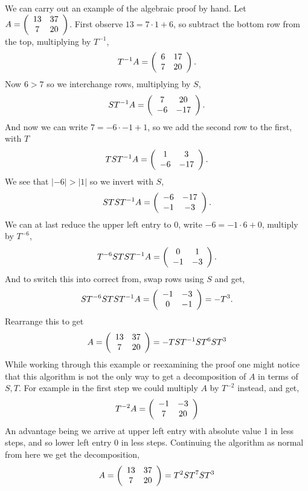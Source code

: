 \begin{example}
We can carry out an example of the algebraic proof by hand. Let $A = \left(\begin{array}{ c c } 13 & 37 \\ 7 & 20 \end{array} \right)$. First observe $13 = 7\cdot 1 + 6$, so subtract the bottom row from the top, multiplying by $T^{-1}$,
$$T^{-1}A = \left(\begin{array}{ c c } 6 & 17 \\ 7 & 20 \end{array} \right).$$
Now $6>7$ so we interchange rows, multiplying by $S$, 
$$ST^{-1}A = \left(\begin{array}{ c c } 7 & 20 \\ -6 & -17  \end{array} \right).$$
And now we can write $7 = -6\cdot -1 +1$, so we add the second row to the first, with $T$
$$TST^{-1}A = \left(\begin{array}{ c c } 1 & 3 \\ -6 & -17  \end{array} \right).$$
We see that $|-6| > |1|$ so we invert with $S$,
$$STST^{-1}A = \left(\begin{array}{ c c } -6 & -17 \\ -1 & -3  \end{array} \right).$$
We can at last reduce the upper left entry to $0$, write $-6 = -1\cdot 6 + 0$, multiply by $T^{-6}$,
$$T^{-6}STST^{-1}A = \left(\begin{array}{ c c } 0 & 1 \\ -1 & -3  \end{array} \right).$$
And to switch this into correct from, swap rows using $S$ and get,
$$ST^{-6}STST^{-1}A = \left(\begin{array}{ c c } -1 & -3 \\ 0 & -1  \end{array} \right) = -T^3.$$
Rearrange this to get 
$$A = \left(\begin{array}{ c c } 13 & 37 \\ 7 & 20 \end{array} \right) = -TST^{-1}ST^6ST^3$$
While working through this example or reexamining the proof one might notice that this algorithm is not the only way to get a decomposition of $A$ in terms of $S,T$. For example in the first step we could multiply $A$ by $T^{-2}$ instead, and get,
$$T^{-2}A =  \left(\begin{array}{ c c } -1 & -3 \\ 7 & 20 \end{array} \right)$$
An advantage being we arrive at upper left entry with absolute value 1 in less steps, and so lower left entry 0 in less steps. Continuing the algorithm as normal from here we get the decomposition,
$$A =\left(\begin{array}{ c c } 13 & 37 \\ 7 & 20 \end{array} \right) = T^2ST^7ST^3$$
\end{example}


